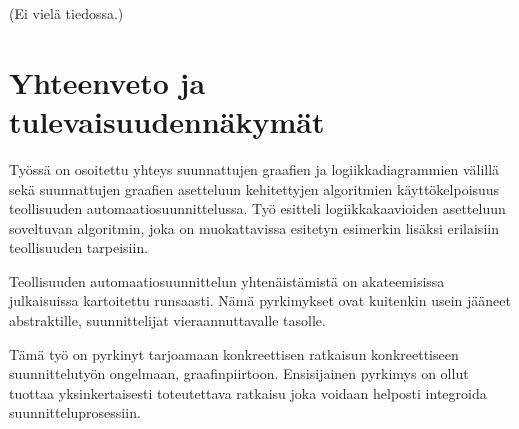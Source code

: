 \documentclass[finnish,12pt]{article}
\begin{document}
(Ei vielä tiedossa.)

	\section{Yhteenveto ja tulevaisuudennäkymät}

Työssä on osoitettu yhteys suunnattujen graafien ja logiikkadiagrammien välillä sekä suunnattujen graafien asetteluun kehitettyjen algoritmien käyttökelpoisuus teollisuuden automaatiosuunnittelussa.
Työ esitteli logiikkakaavioiden asetteluun soveltuvan algoritmin, joka on muokattavissa esitetyn esimerkin lisäksi erilaisiin teollisuuden tarpeisiin.

Teollisuuden automaatiosuunnittelun yhtenäistämistä on akateemisissa julkaisuissa kartoitettu runsaasti.
Nämä pyrkimykset ovat kuitenkin usein jääneet abstraktille, suunnittelijat vieraannuttavalle tasolle.

Tämä työ on pyrkinyt tarjoamaan konkreettisen ratkaisun konkreettiseen suunnittelutyön ongelmaan, graafinpiirtoon.
Ensisijainen pyrkimys on ollut tuottaa yksinkertaisesti toteutettava ratkaisu joka voidaan helposti integroida suunnitteluprosessiin.

\clearpage
{}


\end{document}
